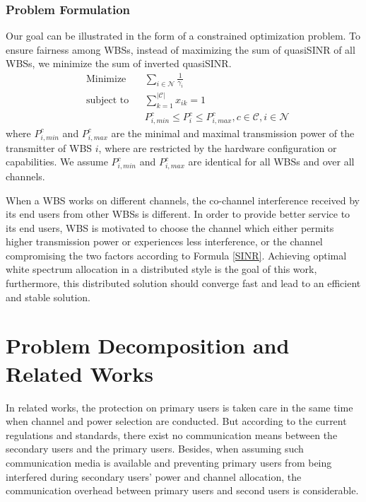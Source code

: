 \subsubsection*{Problem Formulation}
Our goal can be illustrated in the form of a constrained optimization problem.
To ensure fairness among WBSs, instead of maximizing the sum of quasiSINR of all WBSs, we minimize the sum of inverted quasiSINR. 
	\begin{equation}
\label{problem}
			\begin{aligned}
			& {\text{Minimize}}
			& & \sum_{i\in \mathcal{N}}\frac{1}{\gamma_{i}} \\
			& \text{subject to}
			& & \sum_{k=1}^{|\mathcal{C}|}x_{ik}=1 \\
			& & & P_{i,min}^c \leq P_i^c \leq P_{i,max}^c, c \in \mathcal{C}, i\in \mathcal{N}
			\end{aligned}
		\end{equation}
		where $P_{i,min}^c$ and $P_{i,max}^c$ are the minimal and maximal transmission power of the transmitter of WBS $i$, where are restricted by the hardware configuration or capabilities.
We assume $P_{i,min}^c$ and $P_{i,max}^c$ are identical for all WBSs and over all channels.

When a WBS works on different channels, the co-channel interference received by its end users from other WBSs is different.
In order to provide better service to its end users, WBS is motivated to choose the channel which either permits higher transmission power or experiences less interference, or the channel compromising the two factors according to Formula \ref{SINR}.
Achieving optimal white spectrum allocation in a distributed style is the goal of this work, furthermore, this distributed solution should converge fast and lead to an efficient and stable solution.


\section{Problem Decomposition and Related Works}
\label{decomposition_relatedwork}
In related works, the protection on primary users is taken care in the same time when channel and power selection are conducted.
But according to the current regulations and standards, there exist no communication means between the secondary users and the primary users.
Besides, when assuming such communication media is available and preventing primary users from being interfered during secondary users' power and channel allocation, the communication overhead between primary users and second users is considerable.

